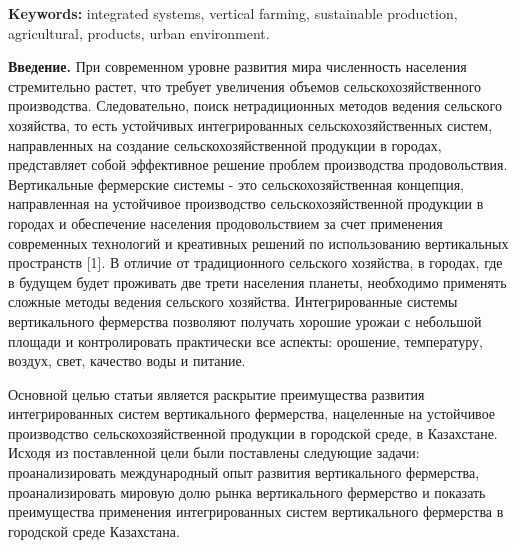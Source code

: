 {\bfseries Keywords:} integrated systems, vertical farming, sustainable
production, agricultural, products, urban environment.

\begin{multicols}{2}
{\bfseries Введение.} При современном уровне развития мира численность
населения стремительно растет, что требует увеличения объемов
сельскохозяйственного производства. Следовательно, поиск нетрадиционных
методов ведения сельского хозяйства, то есть устойчивых интегрированных
сельскохозяйственных систем, направленных на создание
сельскохозяйственной продукции в городах, представляет собой эффективное
решение проблем производства продовольствия. Вертикальные фермерские
системы - это сельскохозяйственная концепция, направленная на устойчивое
производство сельскохозяйственной продукции в городах и обеспечение
населения продовольствием за счет применения современных технологий и
креативных решений по использованию вертикальных пространств {[}1{]}. В
отличие от традиционного сельского хозяйства, в городах, где в будущем
будет проживать две трети населения планеты, необходимо применять
сложные методы ведения сельского хозяйства. Интегрированные системы
вертикального фермерства позволяют получать хорошие урожаи с небольшой
площади и контролировать практически все аспекты: орошение, температуру,
воздух, свет, качество воды и питание.

Основной целью статьи является раскрытие преимущества развития
интегрированных систем вертикального фермерства, нацеленные на
устойчивое производство сельскохозяйственной продукции в городской
среде, в Казахстане. Исходя из поставленной цели были поставлены
следующие задачи: проанализировать международный опыт развития
вертикального фермерства, проанализировать мировую долю рынка
вертикального фермерство и показать преимущества применения
интегрированных систем вертикального фермерства в городской среде
Казахстана.


\end{multicols}
